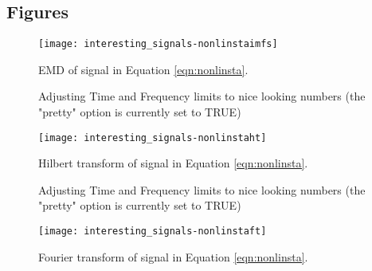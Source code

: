 \documentclass[12pt]{article}
\begin{document}
\FloatBarrier

\subsection{Figures}

\begin{figure}[ht]
\begin{center}
\texttt{[image: interesting\_signals-nonlinstaimfs]}
\end{center}
\caption{EMD of signal in Equation \ref{eqn:nonlinsta}.}
\label{fig:nonlinstaimfs}
\end{figure}

\begin{figure}[ht]
\begin{center}
\begin{Schunk}
\begin{Soutput}
Adjusting Time and Frequency limits to nice looking numbers (the "pretty" option is currently set to TRUE)
\end{Soutput}
\end{Schunk}
\texttt{[image: interesting\_signals-nonlinstaht]}
\end{center}
\caption{Hilbert transform of signal in Equation \ref{eqn:nonlinsta}.}
\label{fig:nonlinstaht}
\end{figure}

\begin{figure}[ht]
\begin{center}
\begin{Schunk}
\begin{Soutput}
Adjusting Time and Frequency limits to nice looking numbers (the "pretty" option is currently set to TRUE)
\end{Soutput}
\end{Schunk}
\texttt{[image: interesting\_signals-nonlinstaft]}
\end{center}
\caption{Fourier transform of signal in Equation \ref{eqn:nonlinsta}.}
\label{fig:nonlinstaft}
\end{figure}
\end{document}
